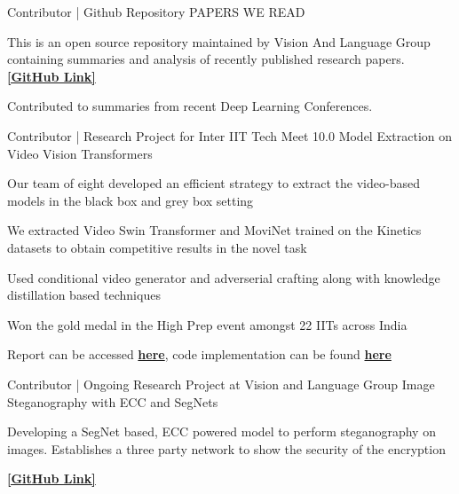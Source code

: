 
\begin{cventries}

\cventry
{Contributor | Github Repository} %
{PAPERS WE READ} %
{} %
{} %
{
  \begin{cvitems} %
    \item {This is an open source repository maintained by Vision And Language Group containing summaries and analysis of recently published research papers. {\href{https://github.com/vlgiitr/papers_we_read}{\bf [GitHub Link]}}}
    \item {Contributed to summaries from recent Deep Learning Conferences.}
  \end{cvitems}
}

\cventry
{Contributor | Research Project for Inter IIT Tech Meet 10.0} %
{Model Extraction on Video Vision Transformers} %
{} %
{} %
{
	\begin{cvitems} %
		\item {Our team of eight developed an efficient strategy to extract the video-based models in the black box and grey box setting}
		\item {We extracted Video Swin Transformer and MoviNet trained on the Kinetics datasets to obtain competitive results in the novel task}
		\item {Used conditional video generator and adverserial crafting along with knowledge distillation based techniques}
		\item {Won the gold medal in the High Prep event amongst 22 IITs across India}
		\item {Report can be accessed {\href{https://github.com/dsgiitr/BOSCH-MODEL-EXTRACTION-ATTACK-FOR-VIDEO-CLASSIFICATION/blob/master/Documentation/report_final.pdf}{\bf here}}, code implementation can be found {\href{https://github.com/dsgiitr/BOSCH-MODEL-EXTRACTION-ATTACK-FOR-VIDEO-CLASSIFICATION}{\bf here}}} 
	\end{cvitems}
}


\cventry
{Contributor | Ongoing Research Project at Vision and Language Group} %
{Image Steganography with ECC and SegNets} %
{} %
{} %
{
	\begin{cvitems} %
		\item {Developing a SegNet based, ECC powered model to perform steganography on images. Establishes a three party network to show the security of the encryption} 
		\item { {\href{https://github.com/vlgiitr/Image-Steganography-with-ECC-and-Neural-Nets}{\bf [GitHub Link]}}}
	\end{cvitems}
}




\end{cventries}
